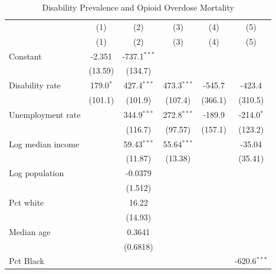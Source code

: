 
\begin{table}[htbp]
   \caption{\label{tab:main} Disability Prevalence and Opioid Overdose Mortality}
   \bigskip
   \centering
   \begin{tabular}{lccccc}
      \toprule
                        & (1)         & (2)            & (3)           & (4)           & (5) \\   
                        & (1)         & (2)            & (3)           & (4)           & (5)\\  
      \midrule 
      Constant          & -2.351      & -737.1$^{***}$ &               &               &   \\   
                        & (13.59)     & (134.7)        &               &               &   \\   
      Disability rate   & 179.0$^{*}$ & 427.4$^{***}$  & 473.3$^{***}$ & -545.7        & -423.4\\   
                        & (101.1)     & (101.9)        & (107.4)       & (366.1)       & (310.5)\\   
      Unemployment rate &             & 344.9$^{***}$  & 272.8$^{***}$ & -189.9        & -214.0$^{*}$\\   
                        &             & (116.7)        & (97.57)       & (157.1)       & (123.2)\\   
      Log median income &             & 59.43$^{***}$  & 55.64$^{***}$ &               & -35.04\\   
                        &             & (11.87)        & (13.38)       &               & (35.41)\\   
      Log population    &             & -0.0379        &               &               &   \\   
                        &             & (1.512)        &               &               &   \\   
      Pct white         &             & 16.22          &               &               &   \\   
                        &             & (14.93)        &               &               &   \\   
      Median age        &             & 0.3641         &               &               &   \\   
                        &             & (0.6818)       &               &               &   \\   
      Pct Black         &             &                &               &               & -620.6$^{***}$\\   

\end{tabular}
\end{table}
